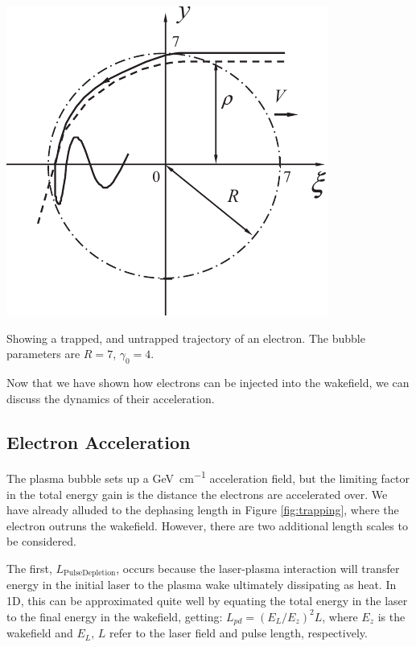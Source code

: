 \documentclass[12pt,letter]{article}
\begin{document}
    \begin{marginfigure}
        \includegraphics[width = \marginparwidth]{../figures/bubbletrap1.pdf}
        \caption{ \label{fig:bubtrap}Showing a trapped, and
        untrapped trajectory of an electron. The bubble parameters are $R
        = 7$, $\gamma_0 = 4$\cite{kostyukov2009electron}.}
\end{marginfigure}
Now that we have shown how electrons can be injected into the wakefield, we can
discuss the dynamics of their acceleration.
    \subsection{Electron Acceleration}
    The plasma bubble sets up a \si{\giga \electronvolt \per
\centi \meter} acceleration field, but the limiting factor in the total energy
    gain is the distance the electrons are accelerated over. We have already
    alluded to the dephasing length in Figure \ref{fig:trapping}, where the electron
    outruns the wakefield. However, there are two additional length scales to be considered.
    
    The first, $L_\mathrm{Pulse Depletion}$, occurs because the laser-plasma
    interaction will transfer energy in the initial laser to the plasma
    wake ultimately dissipating as heat. In 1D, this can
    be approximated quite well by equating
    the total energy in the laser to the final energy in the wakefield, getting:
    $L_{pd} = (E_L/E_z)^2L$, where $E_z$ is the wakefield and $E_L, \,L$ refer
    to the laser field and pulse length,
    respectively\cite{RevModPhys.81.1229}. 
\end{document}
